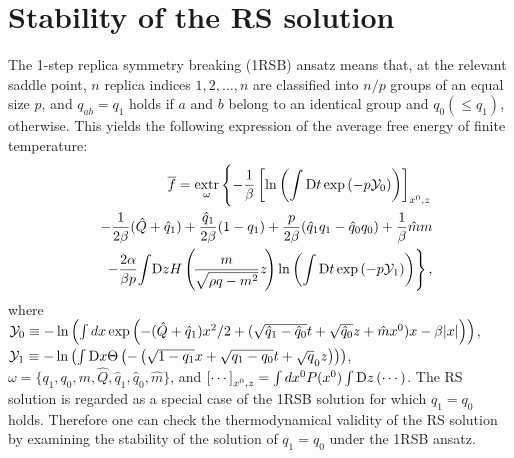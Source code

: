 \documentclass[12pt]{iopart}
\begin{document}
\section{Stability of the RS solution}
\label{RSstability}
The 1-step replica symmetry breaking (1RSB) ansatz means that, at the relevant saddle point, $n$ replica indices $1,2,\ldots,n$ are classified into $n/p$ groups of an equal size $p$, and $q_{ab}=q_1$ holds if $a$ and $b$ belong to an identical group and $q_0(\le q_1)$, otherwise. This yields the following expression of the average free energy of finite temperature:
\begin{eqnarray}
&&\overline{f}=\mathop{\rm extr}_{\omega}\left \{
-\frac{1}{\beta  } \left [ \ln \left (\int {\rm D}{t}
\exp \left (-p {\cal Y}_0 \right )
\right ) \right ]_{x^0,z} \right  . \cr
&& 
\hspace*{0cm}-\frac{1}{2\beta}(\hat{Q}+\hat{q}_1)+\frac{\hat{q}_1}{2\beta} (1-q_1)+\frac{p}{2\beta}
(\hat{q}_1q_1-\hat{q}_0q_0 )+\frac{1}{\beta}\hat{m}m\cr
&&
\hspace*{0cm}\left . 
-\frac{2\alpha}{\beta p}\!
\int \! {\rm D}z H\left (\!\frac{m }{\sqrt{\rho q-m^2}}z\! \right )
\ln \left (\int {\rm D}t \exp \left (-p {\cal Y}_1 \right ) \right )
\right \}, 
\label{1RSB}
\end{eqnarray}
where ${\cal Y}_0\equiv -\ln \left (\int dx \exp \left (-(\hat{Q}+\hat{q}_1)x^2 /2 + (\sqrt{\hat{q}_1-\hat{q}_0}t+\sqrt{\hat{q}_0}z +\hat{m}x^0 )x-\beta |x| \right ) \right )$, ${\cal Y}_1\equiv - \ln \left (\int {\rm D}x \Theta\left (-\left (\sqrt{1-q_1}x+\sqrt{q_1-q_0}t+\sqrt{q}_0 z \right ) \right ) \right )$, $\omega=\{q_1,q_0,m,\hat{Q},\hat{q}_1, \hat{q}_0, \hat{m} \}$, and $\left [\cdots \right]_{x^0,z}=\int dx^0 P(x^0)\int {\rm D}z \left (\cdots \right )$. The RS solution is regarded as a special case of the 1RSB solution for which $q_1=q_0 $ holds. Therefore one can check the thermodynamical validity of the RS solution by examining the stability of the solution of $q_1=q_0$ under the 1RSB ansatz. 
\end{document}
